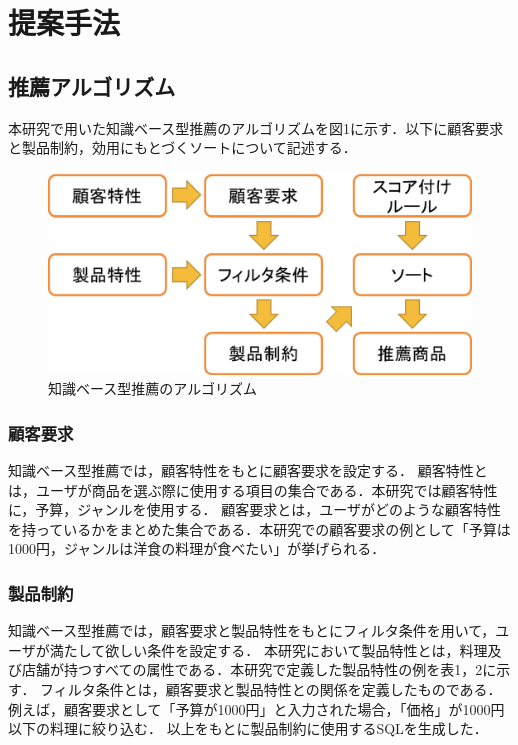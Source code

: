 \documentclass{funthesis}
\begin{document}
\chapter{提案手法}

\section{推薦アルゴリズム}
本研究で用いた知識ベース型推薦のアルゴリズムを図1に示す．以下に顧客要求と製品制約，効用にもとづくソートについて記述する．

\begin{figure}[!b]
  \begin{center}
    \includegraphics[clip,width=13cm]{model.eps}
    \caption{知識ベース型推薦のアルゴリズム}
  \end{center}
\end{figure}

\subsection{顧客要求}
知識ベース型推薦では，顧客特性をもとに顧客要求を設定する．
顧客特性とは，ユーザが商品を選ぶ際に使用する項目の集合である．本研究では顧客特性に，予算，ジャンルを使用する．
顧客要求とは，ユーザがどのような顧客特性を持っているかをまとめた集合である．本研究での顧客要求の例として「予算は1000円，ジャンルは洋食の料理が食べたい」が挙げられる．

\subsection{製品制約}
知識ベース型推薦では，顧客要求と製品特性をもとにフィルタ条件を用いて，ユーザが満たして欲しい条件を設定する．
本研究において製品特性とは，料理及び店舗が持つすべての属性である．本研究で定義した製品特性の例を表1，2に示す．
フィルタ条件とは，顧客要求と製品特性との関係を定義したものである．例えば，顧客要求として「予算が1000円」と入力された場合，「価格」が1000円以下の料理に絞り込む．
以上をもとに製品制約に使用するSQLを生成した．
\end{document}
